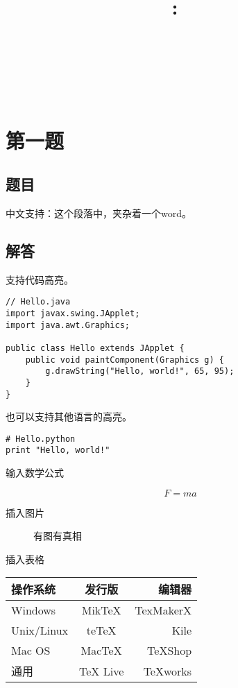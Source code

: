 \documentclass[12pt]{article}
\title{
    \vspace{1.5in}
    \huge{\textmd{\textbf{\hmwkClass:\ \hmwkTitle}}}\\
    \vspace{0.5in}\large{\hmwkClassInstructor\ \quad \hmwkClassCode}
    \vspace{3in}
}
\author{{\hmwkStudentNumber} \\ \hmwkAuthorName \\ \hmwkStudentDepartment}
\date{}
\begin{document}
\maketitle

\pagebreak

\section{第一题}
\subsection{题目}
中文支持：这个段落中，夹杂着一个word。
\subsection{解答}
支持代码高亮。
\begin{lstlisting}
// Hello.java
import javax.swing.JApplet;
import java.awt.Graphics;

public class Hello extends JApplet {
    public void paintComponent(Graphics g) {
        g.drawString("Hello, world!", 65, 95);
    }    
}
\end{lstlisting}

也可以支持其他语言的高亮。
\lstset{language=Python}

\begin{lstlisting}
# Hello.python
print "Hello, world!"
\end{lstlisting}

输入数学公式

$$F = ma$$

插入图片

\begin{figure}[htbp]
\centering
\caption{有图有真相}
\label{fig:myphoto}
\end{figure}

插入表格

\begin{center}
\begin{tabular}{|l|c|r|}
 \hline
操作系统& 发行版& 编辑器\\
 \hline
Windows & MikTeX & TexMakerX \\
 \hline
Unix/Linux & teTeX & Kile \\
 \hline
Mac OS & MacTeX & TeXShop \\
 \hline
通用& TeX Live & TeXworks \\
 \hline
\end{tabular}
\end{center}
\end{document}
